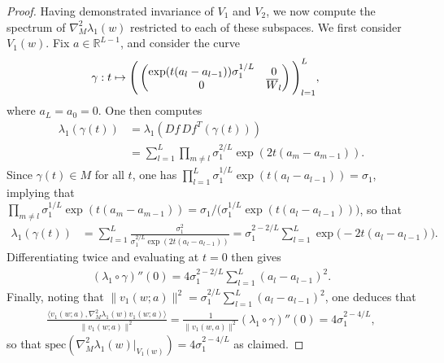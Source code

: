 \documentclass{article}
\newcommand{\RB}{\mathbb{R}}
\newcommand{\bW}{\smash{\overline{W}}\vphantom{W}}
\theoremstyle{plain}
\theoremstyle{definition}
\theoremstyle{remark}
\begin{document}
\begin{proof}
    Having demonstrated invariance of $V_1$ and $V_2$, we now compute the spectrum of $\nabla^2_M\lambda_1(w)$ restricted to each of these subspaces. We first consider $V_1(w)$. Fix $a\in\RB^{L-1}$, and consider the curve
    \begin{align}
    \gamma:t&\mapsto \Bigg(\begin{pmatrix}\exp(t(a_l-a_{l-1}))\sigma_1^{1/L} & 0 \\ 0 & \bW_l\end{pmatrix}\Bigg)_{l=1}^L,
    \end{align}
    where $a_L = a_0 = 0$. One then computes
    \begin{align}
        \lambda_1(\gamma(t)) &=\lambda_1(Df\,Df^T(\gamma(t)))\\&=\sum_{l=1}^L\prod_{m\neq l}\sigma_1^{2/L}\exp(2t(a_m-a_{m-1})).
    \end{align}
    Since $\gamma(t)\in M$ for all $t$, one has $\prod_{l=1}^L\sigma_1^{1/L}\exp(t(a_l-a_{l-1})) = \sigma_1$, implying that $\prod_{m\neq l}\sigma_1^{1/L}\exp(t(a_m-a_{m-1})) = \sigma_1/\big(\sigma_1^{1/L}\exp(t(a_l-a_{l-1}))\big)$, so that
    \begin{align}
    \lambda_1(\gamma(t)) &= \sum_{l=1}^L\frac{\sigma_1^2}{\sigma_1^{2/L}\exp(2t(a_l-a_{l-1}))} = \sigma_1^{2-2/L}\sum_{l=1}^L\exp\big(-2t(a_l-a_{l-1})\big).
    \end{align}
    Differentiating twice and evaluating at $t=0$ then gives
    \begin{align}
    (\lambda_1\circ\gamma)''(0)= 4\sigma_1^{2-2/L}\sum_{l=1}^L(a_l-a_{l-1})^2.
    \end{align}
    Finally, noting that $\|v_1(w;a)\|^2 =\sigma_1^{2/L}\sum_{l=1}^L(a_l-a_{l-1})^2$, one deduces that
    \begin{align}
    \frac{\langle v_1(w;a),\nabla^2_M\lambda_1(w)v_1(w;a)\rangle}{\|v_1(w;a)\|^2} = \frac{1}{\|v_1(w,a)\|^2}(\lambda_1\circ\gamma)''(0) = 4\sigma_1^{2-4/L},
    \end{align}
    so that $\mathrm{spec}(\nabla^2_M\lambda_1(w)|_{V_1(w)}) = 4\sigma_1^{2-4/L}$ as claimed.


\end{proof}
\end{document}
